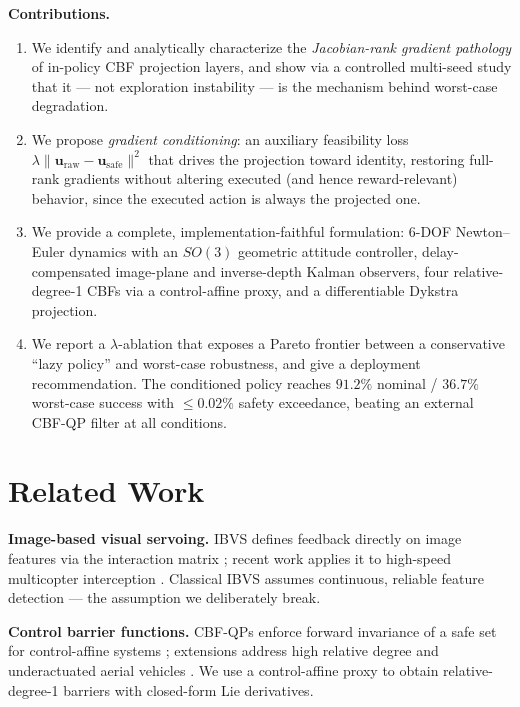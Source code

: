 \documentclass[journal]{IEEEtran}
\newcommand{\uraw}{\mathbf{u}_{\mathrm{raw}}}
\newcommand{\usafe}{\mathbf{u}_{\mathrm{safe}}}
\begin{document}
\textbf{Contributions.}
\begin{enumerate}
\item We identify and analytically characterize the \emph{Jacobian-rank
gradient pathology} of in-policy CBF projection layers, and show via a
controlled multi-seed study that it --- not exploration instability --- is the
mechanism behind worst-case degradation.
\item We propose \emph{gradient conditioning}: an auxiliary feasibility loss
$\lambda\lVert\uraw-\usafe\rVert^2$ that drives the projection toward identity,
restoring full-rank gradients without altering executed (and hence
reward-relevant) behavior, since the executed action is always the projected
one.
\item We provide a complete, implementation-faithful formulation: 6-DOF
Newton--Euler dynamics with an $SO(3)$ geometric attitude controller,
delay-compensated image-plane and inverse-depth Kalman observers, four
relative-degree-1 CBFs via a control-affine proxy, and a differentiable
Dykstra projection.
\item We report a $\lambda$-ablation that exposes a Pareto frontier between a
conservative ``lazy policy'' and worst-case robustness, and give a deployment
recommendation. The conditioned policy reaches $91.2\%$ nominal / $36.7\%$
worst-case success with $\le0.02\%$ safety exceedance, beating an external
CBF-QP filter at all conditions.
\end{enumerate}

\section{Related Work}
\textbf{Image-based visual servoing.} IBVS defines feedback directly on image
features via the interaction matrix \cite{chaumette2006visual}; recent work
applies it to high-speed multicopter interception \cite{yang2024interception}.
Classical IBVS assumes continuous, reliable feature detection --- the
assumption we deliberately break.

\textbf{Control barrier functions.} CBF-QPs enforce forward invariance of a
safe set for control-affine systems \cite{ames2017cbf,ames2019cbf}; extensions
address high relative degree \cite{nguyen2016ecbf} and underactuated aerial
vehicles \cite{wu2016planar}. We use a control-affine proxy to obtain
relative-degree-1 barriers with closed-form Lie derivatives.
\end{document}
